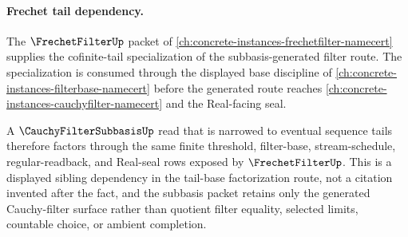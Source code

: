 \paragraph{Frechet tail dependency.}
The $\FrechetFilterUp$ packet of \autoref{ch:concrete-instances-frechetfilter-namecert} supplies the cofinite-tail specialization of the subbasis-generated filter route. The specialization is consumed through the displayed base discipline of \autoref{ch:concrete-instances-filterbase-namecert} before the generated route reaches \autoref{ch:concrete-instances-cauchyfilter-namecert} and the Real-facing seal.

A $\CauchyFilterSubbasisUp$ read that is narrowed to eventual sequence tails therefore factors through the same finite threshold, filter-base, stream-schedule, regular-readback, and Real-seal rows exposed by $\FrechetFilterUp$. This is a displayed sibling dependency in the tail-base factorization route, not a citation invented after the fact, and the subbasis packet retains only the generated Cauchy-filter surface rather than quotient filter equality, selected limits, countable choice, or ambient completion.
